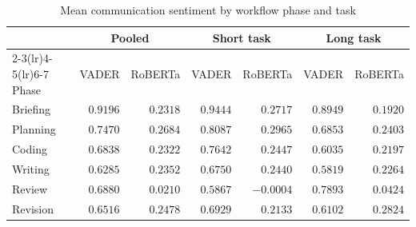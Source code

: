 \begin{table}[htbp]
  \centering
  \small
  \setlength{\tabcolsep}{3pt}
  \caption{Mean communication sentiment by workflow phase and task}
  \label{tab:03-sentiment-phase-means}
\begin{tabular}{lrrrrrr}
    \toprule
    & \multicolumn{2}{c}{Pooled} & \multicolumn{2}{c}{Short task} & \multicolumn{2}{c}{Long task} \\
    \cmidrule(lr){2-3}\cmidrule(lr){4-5}\cmidrule(lr){6-7}
    Phase & VADER & RoBERTa & VADER & RoBERTa & VADER & RoBERTa \\
    \midrule
    Briefing & $0.9196$ & $0.2318$ & $0.9444$ & $0.2717$ & $0.8949$ & $0.1920$ \\
    Planning & $0.7470$ & $0.2684$ & $0.8087$ & $0.2965$ & $0.6853$ & $0.2403$ \\
    Coding & $0.6838$ & $0.2322$ & $0.7642$ & $0.2447$ & $0.6035$ & $0.2197$ \\
    Writing & $0.6285$ & $0.2352$ & $0.6750$ & $0.2440$ & $0.5819$ & $0.2264$ \\
    Review & $0.6880$ & $0.0210$ & $0.5867$ & $-0.0004$ & $0.7893$ & $0.0424$ \\
    Revision & $0.6516$ & $0.2478$ & $0.6929$ & $0.2133$ & $0.6102$ & $0.2824$ \\
    \bottomrule
\end{tabular}%
\end{table}

